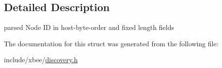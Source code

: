 \subsection{Detailed Description}
parsed Node ID in host-\/byte-\/order and fixed length fields 

The documentation for this struct was generated from the following file\+:\begin{DoxyCompactItemize}
\item 
include/xbee/\hyperlink{discovery_8h}{discovery.\+h}\end{DoxyCompactItemize}
